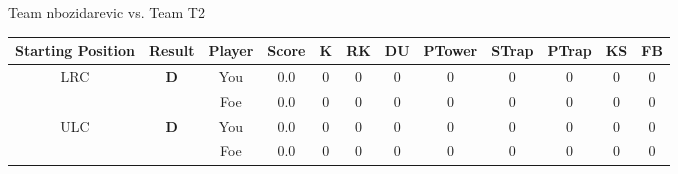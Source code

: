 \documentclass[a4paper,12pt]{article}
\begin{document}
  \vspace*{2em}
  \par {\large {\color{Gray} Team} nbozidarevic {\color{Gray}
      vs. Team} T2}
  \newline
  \begin{tabular}[t]{| c | c | c | c | c | c | c | c | c | c | c | c
      |}
    \hline
    Starting Position & \textbf{Result} & Player & \textbf{Score} & K & RK & DU & PTower & STrap & PTrap & KS & FB \\
    
      
                      
      
                      
      
                      
      
                      
      
        \hline
        \multirow{2}{*}{  LRC
             } &
              \multirow{2}{*}{  
                  \textbf{D}  } & 
                    \cellcolor{yellow!25} You & \cellcolor{yellow!25} 0.0 & \cellcolor{yellow!25} 0 &
                    \cellcolor{yellow!25} 0 & \cellcolor{yellow!25} 0 & \cellcolor{yellow!25} 0 &
                    \cellcolor{yellow!25} 0 & \cellcolor{yellow!25} 0 & \cellcolor{yellow!25} 0 &
                    \cellcolor{yellow!25} 0 \\
                    \cline{3-12}
                    & & \cellcolor{red!15} Foe & \cellcolor{red!15} 0.0 & \cellcolor{red!15} 0 & \cellcolor{red!15}
                    0 & \cellcolor{red!15} 0
                    & \cellcolor{red!15} 0 & \cellcolor{red!15}
                    0 & \cellcolor{red!15} 0 
                    & \cellcolor{red!15} 0 & \cellcolor{red!15}
                    0 \\
                    
                      
      
                      
      
                      
      
                      
      
                      
      
                      
      
        \hline
        \multirow{2}{*}{  ULC  } &
              \multirow{2}{*}{  
                  \textbf{D}  } & 
                    \cellcolor{yellow!25} You & \cellcolor{yellow!25} 0.0 & \cellcolor{yellow!25} 0 &
                    \cellcolor{yellow!25} 0 & \cellcolor{yellow!25} 0 & \cellcolor{yellow!25} 0 &
                    \cellcolor{yellow!25} 0 & \cellcolor{yellow!25} 0 & \cellcolor{yellow!25} 0 &
                    \cellcolor{yellow!25} 0 \\
                    \cline{3-12}
                    & & \cellcolor{red!15} Foe & \cellcolor{red!15} 0.0 & \cellcolor{red!15} 0 & \cellcolor{red!15}
                    0 & \cellcolor{red!15} 0
                    & \cellcolor{red!15} 0 & \cellcolor{red!15}
                    0 & \cellcolor{red!15} 0 
                    & \cellcolor{red!15} 0 & \cellcolor{red!15}
                    0 \\
                    

\end{tabular}
\end{document}
